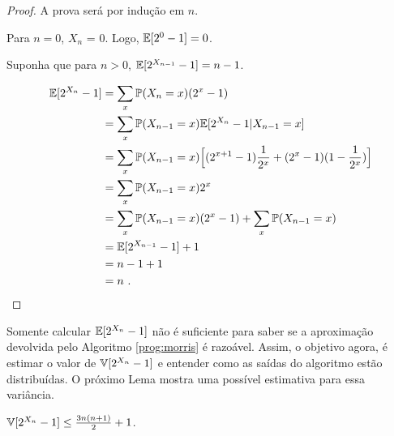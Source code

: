\begin{proof}
A prova será por indução em $n$. 

Para $n = 0$, $X_n$ = 0. Logo, $\mathbb{E}[2^0 - 1] = 0$.

Suponha que para $n > 0$, $\mathbb{E}[2^{X_{n-1}} - 1] = n-1$.

\begin{align*}
  \mathbb{E}[2^{X_n} - 1] 
    &= \sum_{x} \mathbb{P} (X_n = x) (2^x - 1) \\
    &= \sum_{x} \mathbb{P} (X_{n-1} = x) \mathbb{E}[2^{X_n} - 1 | X_{n-1} = x] \\
    &= \sum_{x} \mathbb{P} (X_{n-1} = x) \Big[ (2^{x+1} - 1) \frac{1}{2^x} +  (2^x - 1) (1 - \frac{1}{2^x}) \Big] \\
    &= \sum_{x} \mathbb{P} (X_{n-1} = x) 2^x \\
    &= \sum_{x} \mathbb{P} (X_{n-1} = x) (2^x - 1) + \sum_{x} \mathbb{P} (X_{n-1} = x) \\
    &= \mathbb{E}[2^{X_{n-1}} - 1] + 1 \\
    &= n - 1 + 1 \\
    &= n \ .
\end{align*}

\end{proof}

Somente calcular $\mathbb{E}[2^{X_n} - 1]$ não é suficiente para saber se a aproximação devolvida pelo Algoritmo \ref{prog:morris} é razoável.
Assim, o objetivo agora, é estimar o valor de $\mathbb{V}[2^{X_n} - 1]$ e entender como as saídas do algoritmo estão distribuídas. 
O próximo Lema mostra uma possível estimativa para essa variância.

\begin{lemma} \label{morris:variance}
$\mathbb{V}[2^{X_n} - 1] \leq \frac{3n(n+1)}{2} + 1$.
\end{lemma}

